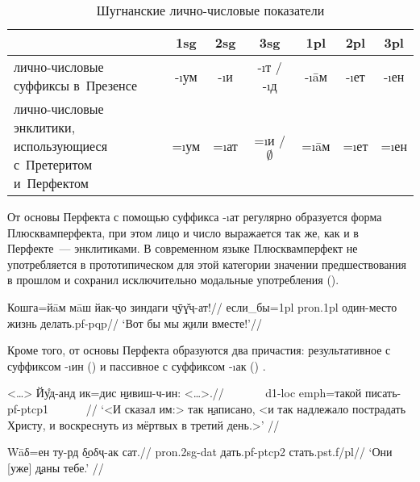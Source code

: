 \begin{table}[H]
 \centering
 \caption{Шугнанские лично-числовые показатели}
 \smallskip
 \label{tab:evid2}
 \begin{tabular}{l|cccccc} \toprule
  & {\sc 1sg} & {\sc 2sg} & {\sc 3sg} & {\sc 1pl} & {\sc 2pl} & {\sc 3pl} \\ \midrule
 \makecell[c]{лично-числовые\\суффиксы в~Презенсе} & -\i{ум} & -\i{и} & -\i{т} / -\i{д} & -\i{āм} & -\i{ет} & -\i{ен} \\ \midrule
 \makecell[c]{лично-числовые\\энклитики, использующиеся\\с~Претеритом и~Перфектом} & =\i{ум} & =\i{ат} & =\i{и} / $\emptyset$ & =\i{āм} & =\i{ет} & =\i{ен} \\ \bottomrule
 \end{tabular}
\end{table}

От основы Перфекта с помощью суффикса -\i{ат} регулярно образуется форма Плюсквамперфекта, при этом лицо и число выражается так же, как и в Перфекте~— энклитиками. В современном языке Плюсквамперфект не употребляется в прототипическом для этой категории значении предшествования в прошлом и сохранил исключительно модальные употребления ().

\begingl
\gla Кошга=йāм мāш йак-ҷо зиндаги \b{чӯɣ̌ҷ-ат}!//
\glc если\_бы={\sc 1pl} {\sc pron.1pl} один-место жизнь делать.{\sc pf-pqp}//
\glft ‘Вот бы мы \b{жили} вместе!’//
\endgl \xe

Кроме того, от основы Перфекта образуются два причастия: результативное с суффиксом -\i{ин} () и пассивное с суффиксом -\i{ак} () \parencite[798–799]{edelman_dodykhudoeva2009_shughni}.

\begingl
\gla <…> Йу̊д-анд ик=дис \b{нивиш-ч-ин}: <…>.//
\glc ~~~~~~ {\sc d1-loc} {\sc emph}=такой писать-{\sc pf-ptcp1} ~~~~~~//
\glft ‘<И сказал им:> так \b{написано}, <и так надлежало пострадать Христу, и воскреснуть из мёртвых в третий день.>’ \trailingcitation{[Лк. 24:46]}//
\endgl \xe

\begingl
\gla Wāδ=ен ту-рд \b{δоδҷ-ак} сат.//
 {\sc pron.2sg-dat} дать.{\sc pf-ptcp2} стать.{\sc pst.f/pl}//
\glft ‘Они [уже] \b{даны} тебе.’ //
\endgl \xe

